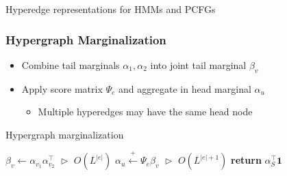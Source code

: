 \documentclass{beamer}
\begin{document}
\begin{frame}
\begin{columns}
\begin{column}{0.5\textwidth}
\begin{center}
\end{center}
\end{column}

\end{columns}

\begin{center}
\small{Hyperedge representations for HMMs and PCFGs}
\end{center}
\end{frame}

\begin{frame}
\frametitle{Hypergraph Marginalization}
\begin{itemize}
\item Combine tail marginals $\alpha_1,\alpha_2$ into joint tail marginal $\beta_v$
\vspace{1em}
\item Apply score matrix $\Psi_e$ and aggregate in head marginal $\alpha_u$
    \begin{itemize}
    \item Multiple hyperedges may have the same head node
    \end{itemize}
\end{itemize}
\centering
\begin{algorithm}[H]
\caption{\label{alg:hypergraph-marg} Hypergraph marginalization}
\begin{algorithmic} 
\STATE $\beta_v \gets \alpha_{v_1}\alpha_{v_2}^\top$
    \hfill $\vartriangleright$ $O(L^{|e|})$
\STATE $\alpha_u \stackrel{+}{\gets} \Psi_e\beta_v$
    \hfill $\vartriangleright$ $O(L^{|e|+1})$
\ENDFOR
\STATE \textbf{return} $\alpha_S^\top \mathbf{1}$
\end{algorithmic}

\end{algorithm}
\end{frame}
\end{document}
